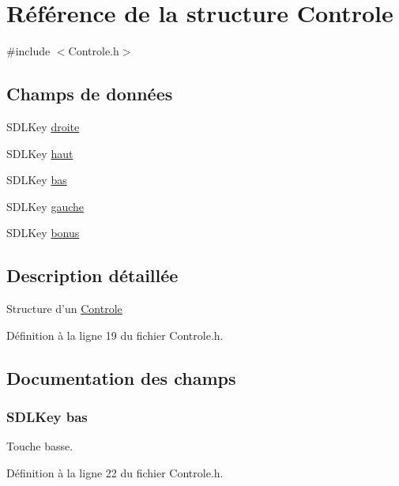 \hypertarget{struct_controle}{\section{Référence de la structure Controle}
\label{struct_controle}
}


{\ttfamily \#include $<$Controle.\-h$>$}

\subsection*{Champs de données}
\begin{DoxyCompactItemize}
\item 
S\-D\-L\-Key \hyperlink{struct_controle_a8c858ff7fc954b8745846564f369c17b}{droite}
\item 
S\-D\-L\-Key \hyperlink{struct_controle_a10afd751fc145f40ed86fe3c43c0e2e7}{haut}
\item 
S\-D\-L\-Key \hyperlink{struct_controle_aeaae5c4f132aac2712690f1863ce950f}{bas}
\item 
S\-D\-L\-Key \hyperlink{struct_controle_a98fff2252bb332ebd2dbb829aaae5315}{gauche}
\item 
S\-D\-L\-Key \hyperlink{struct_controle_aee145d374ea504506aac885e3f52fd1a}{bonus}
\end{DoxyCompactItemize}


\subsection{Description détaillée}
Structure d'un \hyperlink{struct_controle}{Controle} 

Définition à la ligne 19 du fichier Controle.\-h.



\subsection{Documentation des champs}
\hypertarget{struct_controle_aeaae5c4f132aac2712690f1863ce950f}{
\subsubsection[{bas}]{\setlength{\rightskip}{0pt plus 5cm}S\-D\-L\-Key bas}}\label{struct_controle_aeaae5c4f132aac2712690f1863ce950f}
Touche basse. 

Définition à la ligne 22 du fichier Controle.\-h.

